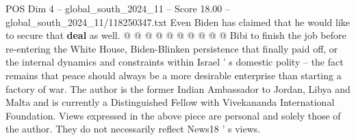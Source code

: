 \begin{textsample}{POS Dim 4 – global\_south\_2024\_11 – Score 18.00 – global\_south\_2024\_11/118250347.txt}
Even Biden has claimed that he would like to secure that \textbf{deal} as well. @ @ @ @ @ @ @ @ @ @ Bibi to finish the job before re-entering the White House, Biden-Blinken persistence that finally paid off, or the internal dynamics and constraints within Israel ' s domestic polity -- the fact remains that peace should always be a more desirable enterprise than starting a factory of war.
The author is the former Indian Ambassador to Jordan, Libya and Malta and is currently a Distinguished Fellow with Vivekananda International Foundation.
Views expressed in the above piece are personal and solely those of the author.
They do not necessarily reflect News18 ' s views.

\end{textsample}
